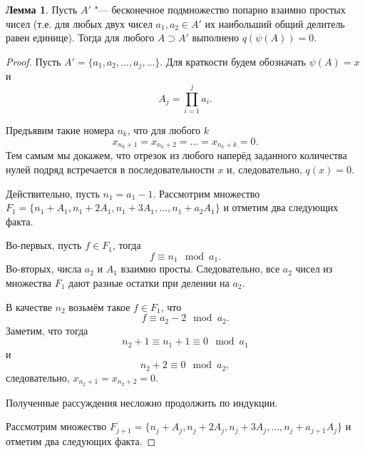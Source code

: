 \documentclass[a4paper,openbib]{article}
\theoremstyle{definition}
\newtheorem{lemma}{Лемма}[section]
\begin{document}
\begin{lemma}
	\label{lem:ac0_primes_infinity_mutually_prime_subset}
	Пусть $A'$ "--- бесконечное подмножество попарно взаимно простых чисел
	(т.е. для любых двух чисел $a_1, a_2 \in A'$ их наибольший общий делитель равен единице).
	Тогда для любого $A \supset A' $ выполнено $q(\psi(A))=0$.
\end{lemma}
\begin{proof}
	Пусть $A' = \{ a_1, a_2, ..., a_j, ... \}$.
	Для краткости будем обозначать $\psi(A) = x$ и
	\begin{equation}
		\label{eq:ac0_primes_A_j_prod_des}
		A_j = \prod_{i=1}^j a_i
		.
	\end{equation}
	
	Предъявим такие номера $n_k$, что для любого $k$
	\begin{equation}
		x_{n_k+1} = x_{n_k+2} = \dots = x_{n_k+k} = 0
		.
	\end{equation}
	Тем самым мы докажем, что отрезок из любого наперёд заданного количества нулей подряд
	встречается в последовательности $x$ и, следовательно, $q(x) = 0$.
	
	Действительно,
	пусть $n_1 = a_1 - 1$.
	Рассмотрим множество  $F_1 = \{ n_1 + A_1, n_1 + 2A_1, n_1 + 3A_1, \dots, n_1 + a_2A_1 \}$
	и отметим два следующих факта.
	
	Во-первых, пусть $f \in F_1$,
	тогда
	\begin{equation}
		f \equiv n_1 \mod a_1
		.
	\end{equation}
	Во-вторых, числа $a_2$ и $A_1$ взаимно просты.
	Следовательно, все $a_2$ чисел из множества $F_1$ дают разные остатки при делении на $a_2$.
	
	В качестве $n_2$ возьмём такое $f\in F_1$, что
	\begin{equation}
		f \equiv a_2 - 2 \mod a_2
		.
	\end{equation}
	Заметим, что тогда
	\begin{equation}
		n_2 + 1 \equiv n_1 + 1 \equiv 0 \mod a_1
	\end{equation}
	и
	\begin{equation}
		n_2 + 2 \equiv 0 \mod a_2
		,
	\end{equation}
	следовательно, 
	$x_{n_2 + 1} = x_{n_2 + 2} = 0$.
	
	Полученные рассуждения несложно продолжить по индукции.

	Рассмотрим множество  $F_{j+1} = \{ n_j + A_j, n_j + 2A_j, n_j + 3A_j, \dots, n_j + a_{j+1}A_j \}$
	и отметим два следующих факта.
	

\end{proof}
\end{document}
